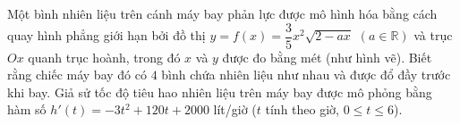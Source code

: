 \begin{ex}%
Một bình nhiên liệu trên cánh máy bay phản lực được mô hình hóa bằng cách quay hình phẳng giới hạn bởi đồ thị $y=f(x)=\dfrac{3}{5}x^2\sqrt{2-ax}$ $(a\in\mathbb{R})$ và trục $Ox$ quanh trục hoành, trong đó $x$ và $y$ được đo bằng mét (như hình vẽ). Biết rằng chiếc máy bay đó có $4$ bình chứa nhiên liệu như nhau và được đổ đầy trước khi bay. Giả sử tốc độ tiêu hao nhiên liệu trên máy bay được mô phỏng bằng hàm số $h'(t)=-3t^2+120t+2000$ lít/giờ ($t$ tính theo giờ, $0\le t\le 6$).
\begin{center}
\end{center}


\end{ex}
